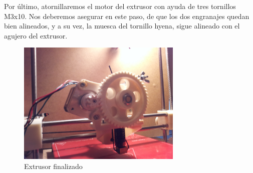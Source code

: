 Por último, atornillaremos el motor del extrusor con ayuda de tres tornillos M3x10. Nos deberemos asegurar en este paso, de que los dos engranajes quedan bien alineados, y a su vez, la muesca del tornillo hyena, sigue alineado con el agujero del extrusor.
\begin{figure}[!htp]
	\centering
	\includegraphics[width=0.7\textwidth]{../../Fotos/105.jpg}
	\caption{Extrusor finalizado}
	\label{fig:8.ext}
\end{figure}
